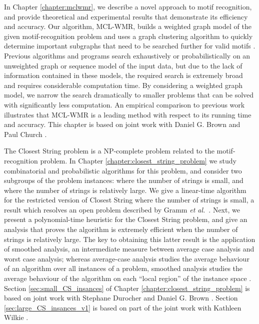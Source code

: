 In Chapter \ref{chapter:mclwmr}, we describe a novel approach to motif recognition, and provide theoretical and experimental results that demonstrate its efficiency and accuracy. Our algorithm, MCL-WMR, builds a weighted graph model of the given motif-recognition problem and uses a graph clustering algorithm to quickly determine important subgraphs that need to be searched further for valid motifs \cite{boucher07}. Previous algorithms and programs search exhaustively or probabilistically on an unweighted graph or sequence model of the input data, but due to the lack of information contained in these models, the required search is extremely broad and requires considerable computation time.  By considering a weighted graph model, we narrow the search dramatically to smaller problems that can be solved with significantly less computation.  An empirical comparison to previous work illustrates that MCL-WMR is a leading method with respect to its running time and accuracy.   This chapter is based on joint work with Daniel G. Brown and Paul Church \cite{boucher07}.

The {\sc Closest String} problem is a NP-complete problem related to the motif-recognition problem. In Chapter \ref{chapter:closest_string_problem} we study combinatorial and probabilistic algorithms for this problem, and consider two subgroups of the problem instances: where the number of strings is small, and where the number of strings is relatively large. We give a linear-time algorithm for the restricted version of {\sc Closest String} where the number of strings is small, a result which resolves an open problem described by Gramm {\em et al.}\ \cite{GNR03}. Next, we present a polynomial-time heuristic for the {\sc Closest String} problem, and give an analysis that proves the algorithm is extremely efficient when the number of strings is relatively large.  The key to obtaining this latter result is the application of smoothed analysis, an intermediate measure between average case analysis and worst case analysis; whereas average-case analysis studies the average behaviour of an algorithm over all instances of a problem, smoothed analysis studies the average behaviour of the algorithm on each ``local region'' of the instance space \cite{ST01}.  Section \ref{sec:small_CS_insances} of Chapter \ref{chapter:closest_string_problem} is based on joint work with Stephane Durocher and Daniel G. Brown \cite{boucher08}.  Section \ref{sec:large_CS_insances_v1} is based on part of the joint work with Kathleen Wilkie \cite{boucher2010_1}. 

